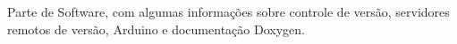 Parte de Software, com algumas informações sobre controle de versão, servidores remotos de versão, Arduino e documentação Doxygen.




